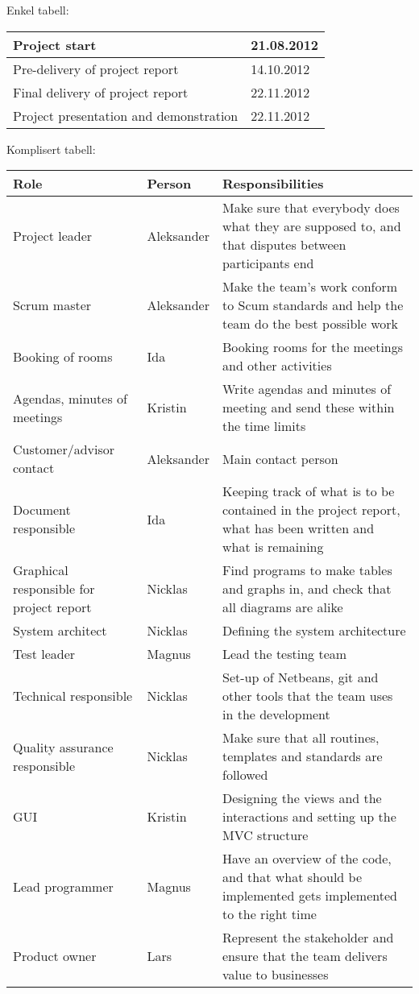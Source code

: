 Enkel tabell:
\begin{tabular}{l|l}
Project start &  21.08.2012\\ \hline
Pre-delivery of project report & 14.10.2012\\ \hline
Final delivery of project report & 22.11.2012\\ \hline
Project presentation and demonstration & 22.11.2012
\end{tabular}

Komplisert tabell:
\begin{tabularx}{\linewidth}{>{\setlength\hsize{.5\hsize}}X|>{\setlength\hsize{0.3\hsize}}X|>{\setlength\hsize{1\hsize}}X}
\textbf{Role} & \textbf{Person} & \textbf{Responsibilities} \\ \hline \hline
Project leader & Aleksander & Make sure that everybody does what they are supposed to, and that disputes between participants end \\ \hline
Scrum master & Aleksander & Make the team’s work conform to Scum standards and help the team do the best possible work \\ \hline
Booking of rooms & Ida & Booking rooms for the meetings and other activities \\ \hline
Agendas, minutes of meetings & Kristin & Write agendas and minutes of meeting and send these within the time limits \\ \hline
Customer/advisor contact & Aleksander & Main contact person \\ \hline
Document responsible & Ida & Keeping track of what is to be contained in the project report, what has been written and what is remaining \\ \hline
Graphical responsible for project report & Nicklas & Find programs to make tables and graphs in, and check that all diagrams are alike \\ \hline
System architect & Nicklas & Defining the system architecture \\ \hline
Test leader & Magnus & Lead the testing team \\ \hline
Technical responsible & Nicklas & Set-up of Netbeans, git and other tools that the team uses in the development \\ \hline
Quality assurance responsible & Nicklas & Make sure that all routines, templates and standards are followed \\ \hline
GUI & Kristin & Designing the views and the interactions and setting up the MVC structure \\ \hline
Lead programmer & Magnus & Have an overview of the code, and that what should be implemented gets implemented to the right time \\ \hline
Product owner & Lars & Represent the stakeholder and ensure that the team delivers value to businesses
\end{tabularx}

